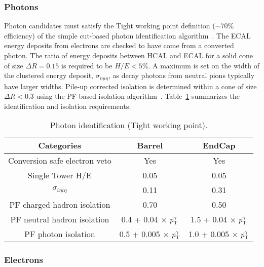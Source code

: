 \subsubsection{Photons\label{sec:recPhot}}
%
Photon candidates must satisfy the Tight working point definition 
($\sim$70\% efficiency) of the simple cut-based photon identification
algorithm~\cite{ref:photon-id-egamma}. The ECAL energy deposits from electrons
are checked to have come from a converted photon. The ratio of energy deposits 
between HCAL and ECAL for a solid cone of size $\Delta R = 0.15$ is required to 
be $H/E < 5\%$. A maximum is set on the width of the clustered energy deposit, 
$\sigma_{i\eta i\eta}$, as decay photons from neutral pions typically have larger
widths. Pile-up corrected isolation is determined within a cone of size $\Delta R < 0.3$ 
using the PF-based isolation algorithm~\cite{ref:photon-id-egamma}.
Table~\ref{tab:photon-id-egamma} summarizes the identification and isolation requirements.
\begin{table}[ht!]
  \caption{Photon identification (Tight working point).\label{tab:photon-id-egamma}}
  \centering
  \footnotesize
  \begin{tabular}{ ccc }
    \hline
    \hline
    Categories                    & Barrel                             & EndCap                             \\
    \hline
    Conversion safe electron veto & Yes                                & Yes                                \\
    Single Tower H/E              & 0.05                               & 0.05                               \\
    $\sigma_{i\eta i\eta}$        & 0.11                               & 0.31                               \\
    PF charged hadron isolation   & 0.70                               & 0.50                               \\
    PF neutral hadron isolation   & 0.4 + 0.04 $\times$ $p_{\mathrm{T}}^{\gamma}$  & 1.5 + 0.04 $\times$ $p_{\mathrm{T}}^{\gamma}$  \\
    PF photon isolation           & 0.5 + 0.005 $\times$ $p_{\mathrm{T}}^{\gamma}$ & 1.0 + 0.005 $\times$ $p_{\mathrm{T}}^{\gamma}$ \\
    \hline
    \hline
  \end{tabular}
\end{table}
\FloatBarrier
\subsubsection{Electrons\label{sec:recElectron}}

